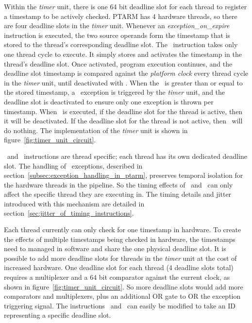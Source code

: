 Within the \emph{timer} unit, there is one 64 bit deadline slot for each thread to register a timestamp to be actively checked. 
PTARM has 4 hardware threads, so there are four deadline slots in the \emph{timer} unit. 
Whenever an \emph{exception\_on\_expire} instruction is executed, the two source operands form the timestamp that is stored to the thread's corresponding deadline slot.
The \exceptiononexpire\ instruction takes only one thread cycle to execute.
It simply stores and activates the timestamp in the thread's deadline slot.
Once activated, program execution continues, and the deadline slot timestamp is compared against the \emph{platform clock} every thread cycle in the \emph{timer} unit, until deactivated with \deactivateexception.
When the \platformclock\ is greater than or equal to the stored timestamp, a \timerexpired\ exception is triggered by the \emph{timer} unit, and the deadline slot is deactivated to ensure only one exception is thrown per timestamp.
When \deactivateexception\ is executed, if the deadline slot for the thread is active, then it will be deactivated. 
If the deadline slot for the thread is not active, then \deactivateexception\ will do nothing.
The implementation of the \emph{timer} unit is shown in figure~\ref{fig:timer_unit_circuit}.   

\Exceptiononexpire\ and \deactivateexception\ instructions are thread specific; each thread has its own dedicated deadline slot.
The handling of \timerexpired\ exceptions, described in section~\ref{subsec:exception_handling_in_ptarm}, preserves temporal isolation for the hardware threads in the pipeline.
So the timing effects of \exceptiononexpire\ and \deactivateexception\ can only affect the specific thread they are executing in.
The timing details and jitter introduced with this mechanism are detailed in section~\ref{sec:jitter_of_timing_instructions}.

Each thread currently can only check for one timestamp in hardware. 
To create the effects of multiple timestamps being checked in hardware, the timestamps need to managed in software and share the one physical deadline slot.
It is possible to add more deadline slots for threads in the \emph{timer} unit at the cost of increased hardware.
One deadline slot for each thread (4 deadline slots total) requires a multiplexer and a 64 bit comparator against the current clock, as shown in figure~\ref{fig:timer_unit_circuit}.
So more deadline slots would add more comparators and multiplexers, plus an additional OR gate to OR the exception triggering signal. 
The instructions \exceptiononexpire\ and \deactivateexception\ can easily be modified to take an ID representing a specific deadline slot.

